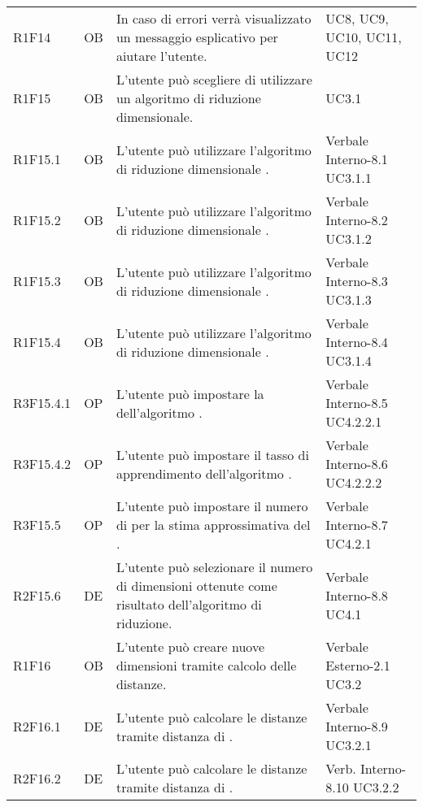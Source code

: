{\begin{longtable}{C{2cm} | C{1.5cm} | C{9cm} | C{3.3cm}}
R1F14 & OB & In caso di errori verrà visualizzato un messaggio esplicativo per aiutare l'utente. & UC8, UC9, UC10, UC11, UC12\\
R1F15 & OB & L'utente può scegliere di utilizzare un algoritmo di riduzione dimensionale. & UC3.1 \\
R1F15.1 & OB & L'utente può utilizzare l'algoritmo di riduzione dimensionale . & Verbale Interno-8.1 \newline UC3.1.1 \\
R1F15.2 & OB & L'utente può utilizzare l'algoritmo di riduzione dimensionale . & Verbale Interno-8.2 \newline UC3.1.2\\
R1F15.3 & OB & L'utente può utilizzare l'algoritmo di riduzione dimensionale . & Verbale Interno-8.3 \newline UC3.1.3\\
R1F15.4 & OB & L'utente può utilizzare l'algoritmo di riduzione dimensionale . & Verbale Interno-8.4 \newline UC3.1.4\\
R3F15.4.1 & OP & L'utente può impostare la  dell'algoritmo . & Verbale Interno-8.5 \newline UC4.2.2.1\\
R3F15.4.2 & OP & L'utente può impostare il tasso di apprendimento dell'algoritmo . & Verbale Interno-8.6 \newline UC4.2.2.2\\
R3F15.5 & OP & L'utente può impostare il numero di  per la stima approssimativa del . & Verbale Interno-8.7 \newline UC4.2.1\\
R2F15.6 & DE & L'utente può selezionare il numero di dimensioni ottenute come risultato dell'algoritmo di riduzione. & Verbale Interno-8.8 \newline UC4.1\\
R1F16 & OB & L'utente può creare nuove dimensioni tramite calcolo delle distanze. & Verbale Esterno-2.1 \newline UC3.2\\ 
R2F16.1 & DE & L'utente può calcolare le distanze tramite distanza di . &  Verbale Interno-8.9 \newline UC3.2.1\\
R2F16.2 & DE & L'utente può calcolare le distanze tramite distanza di . & Verb. Interno-8.10 \newline UC3.2.2 \\

\end{longtable}}
